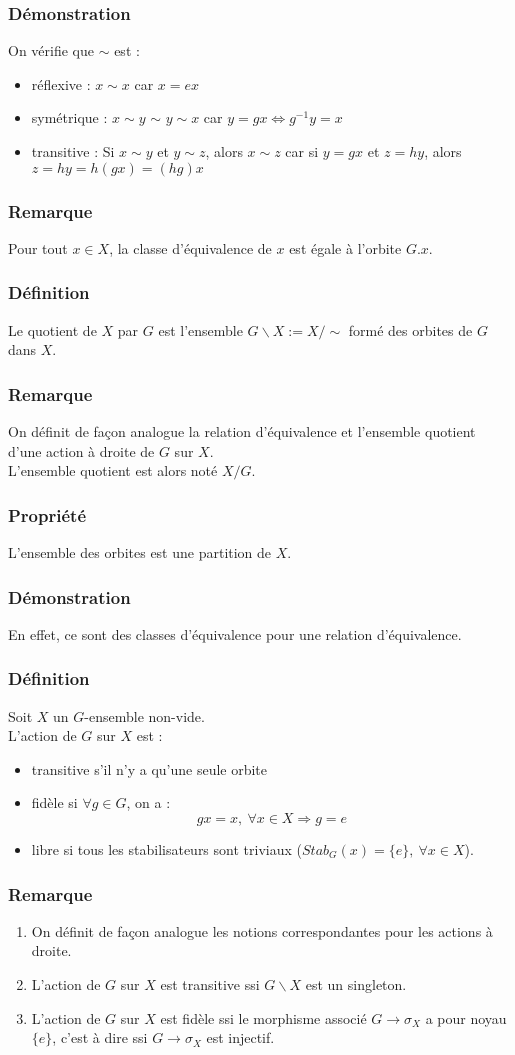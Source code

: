 \documentclass[a4paper, oneside]{report}
\newcommand{\defi}{\subsubsection{Définition}}
\newcommand{\dem}{\subsubsection{Démonstration}}
\newcommand{\propr}{\subsubsection{Propriété}}
\newcommand{\remar}{\subsubsection{Remarque}}
\begin{document}
\dem
On vérifie que $\sim$ est :
\begin{itemize}
\item réflexive : $x\sim x$ car $x=ex$
\item symétrique : $x\sim y$ $\sim$ $y\sim x$ car $y=gx\Leftrightarrow g^{-1}y=x$
\item transitive : Si $x\sim y$ et $y\sim z$, alors $x\sim z$ car si $y=gx$ et $z=hy$, alors $z=hy=h(gx)=(hg)x$
\end{itemize}

\remar
Pour tout $x\in X$, la classe d'équivalence de $x$ est égale à l'orbite $G.x$.

\defi 
Le quotient de $X$ par $G$ est l'ensemble $G\backslash X := X/\sim$ formé des orbites de $G$ dans $X$.

\remar
On définit de façon analogue la relation d'équivalence et l'ensemble quotient d'une action à droite de $G$ sur $X$.\\
L'ensemble quotient est alors noté $X/G$.

\propr
L'ensemble des orbites est une partition de $X$.

\dem
En effet, ce sont des classes d'équivalence pour une relation d'équivalence.

\defi 
Soit $X$ un $G$-ensemble non-vide.\\
L'action de $G$ sur $X$ est :
\begin{itemize}
\item transitive s'il n'y a qu'une seule orbite
\item fidèle si $\forall g\in G$, on a :
$$gx=x,~\forall x\in X \Rightarrow g=e$$
\item libre si tous les stabilisateurs sont triviaux ($Stab_G(x)=\{e\},~\forall x\in X$).
\end{itemize}

\remar
\begin{enumerate}
\item On définit de façon analogue les notions correspondantes pour les actions à droite.
\item L'action de $G$ sur $X$ est transitive ssi $G\backslash X$ est un singleton.
\item L'action de $G$ sur $X$ est fidèle ssi le morphisme associé $G\rightarrow \sigma_X$ a pour noyau $\{e\}$, c'est à dire ssi $G\rightarrow \sigma_X$ est injectif.
\end{enumerate}
\end{document}
